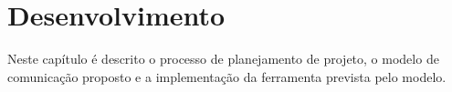 \chapter{Desenvolvimento}

Neste capítulo é descrito o processo de planejamento de projeto, o modelo de comunicação proposto e a implementação da ferramenta prevista pelo modelo.




